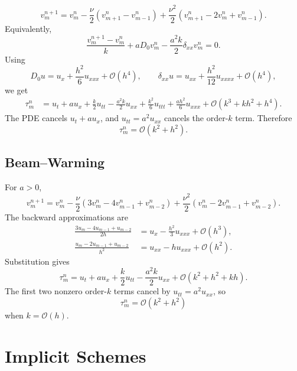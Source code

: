 \documentclass[11pt]{article}
\newcommand{\Oh}{\mathcal{O}}
\begin{document}
\begin{equation}
    v_m^{n+1}
    =
    v_m^n
    -\frac{\nu}{2}(v_{m+1}^n-v_{m-1}^n)
    +\frac{\nu^2}{2}(v_{m+1}^n-2v_m^n+v_{m-1}^n).
\end{equation}
Equivalently,
\begin{equation}
    \frac{v_m^{n+1}-v_m^n}{k}
    +aD_0v_m^n-\frac{a^2k}{2}\delta_{xx}v_m^n=0.
\end{equation}
Using
\begin{equation}
    D_0u=u_x+\frac{h^2}{6}u_{xxx}+\Oh(h^4),
    \qquad
    \delta_{xx}u=u_{xx}+\frac{h^2}{12}u_{xxxx}+\Oh(h^4),
\end{equation}
we get
\begin{align}
    \tau_m^n
    &=
    u_t+a u_x
    +\frac{k}{2}u_{tt}
    -\frac{a^2k}{2}u_{xx}
    +\frac{k^2}{6}u_{ttt}
    +\frac{a h^2}{6}u_{xxx}
    +\Oh(k^3+kh^2+h^4).
\end{align}
The PDE cancels $u_t+a u_x$, and $u_{tt}=a^2u_{xx}$ cancels the order-$k$ term.  Therefore
\begin{equation}
    \tau_m^n=\Oh(k^2+h^2).
\end{equation}

\subsection{Beam--Warming}

For $a>0$,
\begin{equation}
    v_m^{n+1}
    =
    v_m^n
    -\frac{\nu}{2}(3v_m^n-4v_{m-1}^n+v_{m-2}^n)
    +\frac{\nu^2}{2}(v_m^n-2v_{m-1}^n+v_{m-2}^n).
\end{equation}
The backward approximations are
\begin{align}
    \frac{3u_m-4u_{m-1}+u_{m-2}}{2h}
    &=
    u_x-\frac{h^2}{3}u_{xxx}+\Oh(h^3),\\
    \frac{u_m-2u_{m-1}+u_{m-2}}{h^2}
    &=
    u_{xx}-h u_{xxx}+\Oh(h^2).
\end{align}
Substitution gives
\begin{equation}
    \tau_m^n
    =
    u_t+a u_x
    +\frac{k}{2}u_{tt}
    -\frac{a^2k}{2}u_{xx}
    +\Oh(k^2+h^2+kh).
\end{equation}
The first two nonzero order-$k$ terms cancel by $u_{tt}=a^2u_{xx}$, so
\begin{equation}
    \tau_m^n=\Oh(k^2+h^2)
\end{equation}
when $k=\Oh(h)$.

\section{Implicit Schemes}
\end{document}
